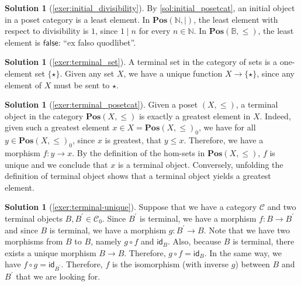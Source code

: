 \documentclass[a4paper,11pt, oneside,titlepage=false]{scrbook}
\theoremstyle{plain}
\theoremstyle{definition}
\newtheorem{solution}[thm]{Solution}
\newcommand{\cfont}[1]{\ensuremath{\mathsf{#1}}}
\newcommand{\Cat}[1]{\mathcal{#1}}
\newcommand{\CC}{\Cat{C}}
\newcommand{\Catb}[1]{\mathbf{#1}}
\newcommand{\POS}{\Catb{Pos}}
\newcommand{\Ob}[1]{{#1}_0}
\newcommand{\Id}[1][]{\cfont{id}_{#1}}
\newcommand{\NN}{\ensuremath{\mathbb{N}}}
\begin{document}
\begin{solution}[\cref{exer:initial_divisibility}]\label{sol:initial_divisibility}
  By \cref{sol:initial_posetcat}, an initial object in a poset category is a
  least element.
  In $\POS(\NN,\mid)$, the least element with respect to divisibility is $1$,
  since $1 \mid n$ for every $n \in \NN$.
  In $\POS(\mathbb{B},\leq)$, the least element is $\mathsf{false}$:
  ``ex falso quodlibet''.
\end{solution}

\begin{solution}[\cref{exer:terminal_set}]\label{sol:terminal_set}
	A terminal set in the category of sets is a one-element set $ \{ \star \} $. Given any set $ X $, we have a unique function $ X \to \{\star\} $, since any element of $ X $ must be sent to $ \star $.
\end{solution}

\begin{solution}[\cref{exer:terminal_posetcat}]\label{sol:terminal_posetcat}
	Given a poset $ (X, \leq) $, a terminal object in the category $ \POS(X, \leq) $ is exactly a greatest element in $ X $. Indeed, given such a greatest element $ x \in X = \POS(X, \leq)_0 $, we have for all $ y \in \POS(X, \leq)_0 $, since $ x $ is greatest, that $ y \leq x $. Therefore, we have a morphism $ f: y \to x $. By the definition of the hom-sets in $ \POS(X, \leq) $, $ f $ is unique and we conclude that $ x $ is a terminal object.
	Conversely, unfolding the definition of terminal object shows that a terminal object yields a greatest element.
\end{solution}

\begin{solution}[\cref{exer:terminal-unique}]\label{sol:terminal-unique}
	Suppose that we have a category $ \CC $ and two terminal objects $ B, B^\prime \in \Ob\CC $. Since $ B^\prime $ is terminal, we have a morphism $ f: B \to B^\prime $ and since $ B $ is terminal, we have a morphism $ g: B^\prime \to B $. Note that we have two morphisms from $ B $ to $ B $, namely $ g \circ f $ and $ \Id[B] $. Also, because $ B $ is terminal, there exists a unique morphism $ B \to B $. Therefore, $ g \circ f = \Id[B] $. In the same way, we have $ f \circ g = \Id[B^\prime] $. Therefore, $ f $ is the isomorphism (with inverse $g$) between $ B $ and $ B^\prime $ that we are looking for.
\end{solution}
\end{document}
